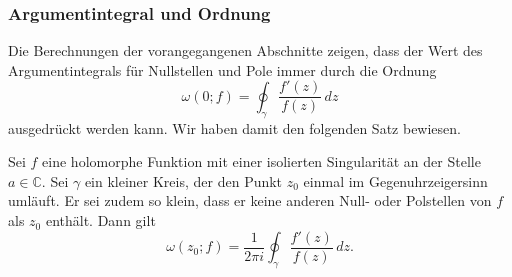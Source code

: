 %
%
\subsubsection{Argumentintegral und Ordnung}
Die Berechnungen der vorangegangenen Abschnitte zeigen, dass
der Wert des Argumentintegrals für Nullstellen und Pole 
immer durch die Ordnung
\[
\omega(0;f)
=
\oint_{\gamma}
\frac{f'(z)}{f(z)}
\,dz
\]
ausgedrückt werden kann.
Wir haben damit den folgenden Satz bewiesen.

\begin{satz}[Ordnung]
\label{buch:analytisch:argument:satz:ordnung}
Sei $f$ eine holomorphe Funktion mit einer isolierten Singularität
an der Stelle $a\in\mathbb{C}$.
%
Sei $\gamma$ ein kleiner Kreis, der den Punkt $z_0$ einmal im
Gegenuhrzeigersinn umläuft.
Er sei zudem so klein, dass er keine anderen Null- oder Polstellen
von $f$ als $z_0$ enthält.
Dann gilt
\[
\omega(z_0;f)
=
\frac{1}{2\pi i}
\oint_{\gamma}
\frac{f'(z)}{f(z)}
\,dz.
\]
\end{satz}
